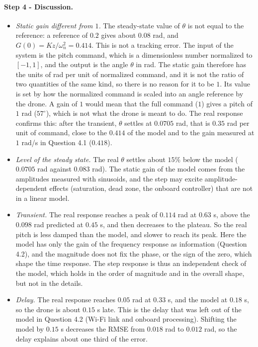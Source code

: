 \paragraph{Step 4 - Discussion.}
\begin{itemize}
\item \emph{Static gain different from $1$.}
The steady-state value of $\theta$ is not equal to the reference: a reference of $0.2$ gives about $0.08$ rad, and $G(0) = K z/\omega_n^2 = 0.414$.
This is not a tracking error.
The input of the system is the pitch command, which is a dimensionless number normalized to $[-1, 1]$, and the output is the angle $\theta$ in rad.
The static gain therefore has the units of rad per unit of normalized command, and it is not the ratio of two quantities of the same kind, so there is no reason for it to be $1$.
Its value is set by how the normalized command is scaled into an angle reference by the drone.
A gain of $1$ would mean that the full command ($1$) gives a pitch of $1$ rad ($57^\circ$), which is not what the drone is meant to do.
The real response confirms this: after the transient, $\theta$ settles at $0.0705$ rad, that is $0.35$ rad per unit of command, close to the $0.414$ of the model and to the gain measured at $1$ rad/s in Question 4.1 ($0.418$).
\item \emph{Level of the steady state.}
The real $\theta$ settles about $15\%$ below the model ($0.0705$ rad against $0.083$ rad).
The static gain of the model comes from the amplitudes measured with sinusoids, and the step may excite amplitude-dependent effects (saturation, dead zone, the onboard controller) that are not in a linear model.
\item \emph{Transient.}
The real response reaches a peak of $0.114$ rad at $0.63$ s, above the $0.098$ rad predicted at $0.45$ s, and then decreases to the plateau.
So the real pitch is less damped than the model, and slower to reach its peak.
Here the model has only the gain of the frequency response as information (Question 4.2), and the magnitude does not fix the phase, or the sign of the zero, which shape the time response.
The step response is thus an independent check of the model, which holds in the order of magnitude and in the overall shape, but not in the details.
\item \emph{Delay.}
The real response reaches $0.05$ rad at $0.33$ s, and the model at $0.18$ s, so the drone is about $0.15$ s late.
This is the delay that was left out of the model in Question 4.2 (Wi-Fi link and onboard processing).
Shifting the model by $0.15$ s decreases the RMSE from $0.018$ rad to $0.012$ rad, so the delay explains about one third of the error.
\end{itemize}

